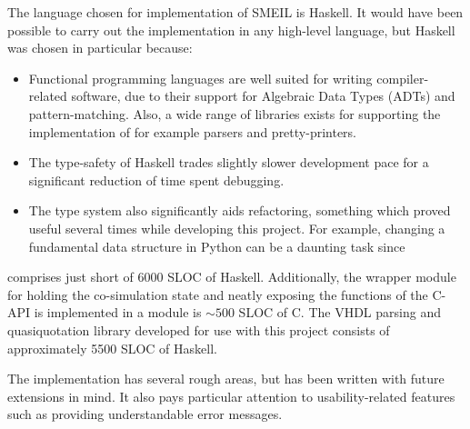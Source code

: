 The language chosen for implementation of SMEIL is Haskell. It would have been
possible to carry out the implementation in any high-level language, but Haskell
was chosen in particular because:
\begin{itemize}
\item Functional programming languages are well suited for writing
  compiler-related software, due to their support for Algebraic Data Types
  (ADTs) and pattern-matching. Also, a wide range of libraries exists for
  supporting the implementation of for example parsers and pretty-printers.
\item The type-safety of Haskell trades slightly slower development pace for a
  significant reduction of time spent debugging.
\item The type system also significantly aids refactoring, something which
  proved useful several times while developing this project. For
  example, changing a fundamental data structure in Python can be a daunting
  task since 
\end{itemize}


\libsme{} comprises just short of 6000 SLOC of Haskell. Additionally, the
wrapper module for holding the co-simulation state and neatly exposing the
functions of the C-API is implemented in a module is $\sim 500$ SLOC of C. The
VHDL parsing and quasiquotation library developed for use with this project
consists of approximately 5500 SLOC of Haskell.

The implementation has several rough areas, but has been written with future
extensions in mind. It also pays particular attention to usability-related
features such as providing understandable error messages.

